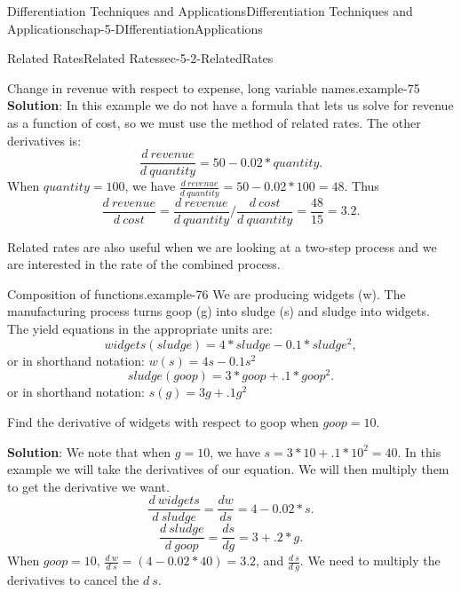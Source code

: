 \documentclass[oneside,10pt,]{book}
\newcommand{\terminology}[1]{\textbf{#1}}
\numberwithin{equation}{section}
\begin{document}
\begin{chapterptx}{Differentiation Techniques and Applications}{}{Differentiation Techniques and Applications}{}{}{chap-5-DIfferentiationApplications}
\begin{sectionptx}{Related Rates}{}{Related Rates}{}{}{sec-5-2-RelatedRates}
\begin{example}{Change in revenue with respect to expense, long variable names.}{example-75}
\hypertarget{p-1955}{}%
\terminology{Solution}:  In this example we do not have a formula that lets us solve for revenue as a function of cost, so we must use the method of related rates.  The other derivatives is:%
%
\begin{equation*}
\frac{d\ revenue}{d\ quantity}  =50-0.02*quantity.
\end{equation*}
\hypertarget{p-1956}{}%
When \(quantity=100\), we have \(\frac{d\ revenue}{d\ quantity}  =50-0.02*100=48\).  Thus%
%
\begin{equation*}
\frac{d\ revenue}{d\ cost} 
=\frac{d\ revenue}{d\ quantity}/\frac{d\ cost}{d\ quantity}
=\frac{48}{15}=3.2.
\end{equation*}
\end{example}
\hypertarget{p-1957}{}%
Related rates are also useful when we are looking at a two-step process and we are interested in the rate of the combined process.%
\begin{example}{Composition of functions.}{example-76}%
\hypertarget{p-1958}{}%
We are producing widgets (w).  The manufacturing process turns goop (g) into sludge (s) and sludge into widgets.  The yield equations in the appropriate units are:%
%
\begin{equation*}
widgets(sludge)=4*sludge-0.1*sludge^2, 
\end{equation*}
\hypertarget{p-1959}{}%
or in shorthand notation: \(w(s)=4 s-0.1 s^2\)%
%
\begin{equation*}
sludge(goop)=3*goop+.1*goop^2.
\end{equation*}
\hypertarget{p-1960}{}%
or in shorthand notation: \(s(g)=3 g+.1 g^2\)%
\par
\hypertarget{p-1961}{}%
Find the derivative of widgets with respect to goop when \(goop=10\).%
\par
\hypertarget{p-1962}{}%
\terminology{Solution}: We note that when \(g=10\), we have \(s=3*10+.1*10^2=40\).  In this example we will take the derivatives of our equation.  We will then multiply them to get the derivative we want.%
%
\begin{equation*}
\frac{d\ widgets}{d\ sludge}=\frac{dw}{ds}=4-0.02*s.
\end{equation*}
%
\begin{equation*}
\frac{d\ sludge}{d\ goop}=\frac{ds}{dg}=3+.2*g.
\end{equation*}
\hypertarget{p-1963}{}%
When \(goop=10\), \(\frac{d\ w}{d\ s}  =(4-0.02*40)=3.2\), and \(\frac{d\ s}{d\ g}\).  We need to multiply the derivatives to cancel the \(d\ s\).%
%
\begin{equation*}

\end{equation*}
\end{example}
\end{sectionptx}
\end{chapterptx}
\end{document}
